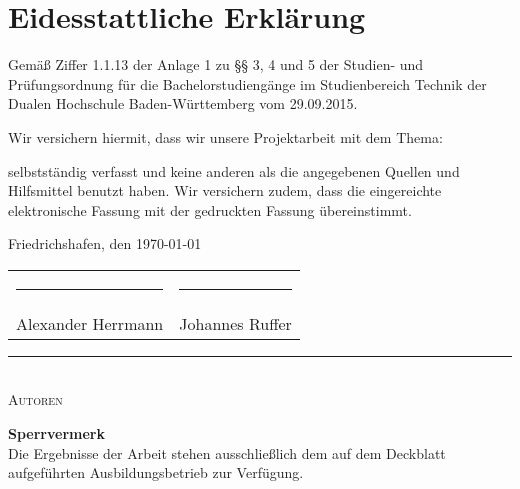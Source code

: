 \chapter*{Eidesstattliche Erklärung} %


Gemäß Ziffer 1.1.13 der Anlage 1 zu §§ 3, 4 und 5  der Studien- und Prüfungsordnung für die Bachelorstudiengänge im Studienbereich Technik der Dualen Hochschule Baden-Würt­tem­berg vom 29.09.2015.

Wir versichern hiermit, dass wir unsere Projektarbeit mit dem Thema: 

\begin{quote}
	\textit{\titel} \textit{ \untertitel }
\end{quote}

selbstständig verfasst und keine anderen als die angegebenen Quellen und Hilfsmittel benutzt haben. Wir versichern zudem, dass die eingereichte elektronische Fassung mit der gedruckten Fassung übereinstimmt.

Friedrichshafen, den \today \\[2ex]

\begin{center}

\begin{tabular}{cc}
	\rule[-0.2cm]{0.3\linewidth}{0.5pt} & \rule[-0.2cm]{0.3\linewidth}{0.5pt}\\
	Alexander Herrmann & Johannes Ruffer\\
\end{tabular}

\rule{0.75\linewidth}{0.1pt}\\
\textsc{Autoren} \\[10ex]
\end{center}


\noindent \textbf{\Large{Sperrvermerk}}\\
\normalsize
Die Ergebnisse der Arbeit stehen ausschließlich dem auf dem Deckblatt aufgeführten Ausbildungsbetrieb zur Verfügung.

\normalsize

\rmfamily



\cleardoublepage
